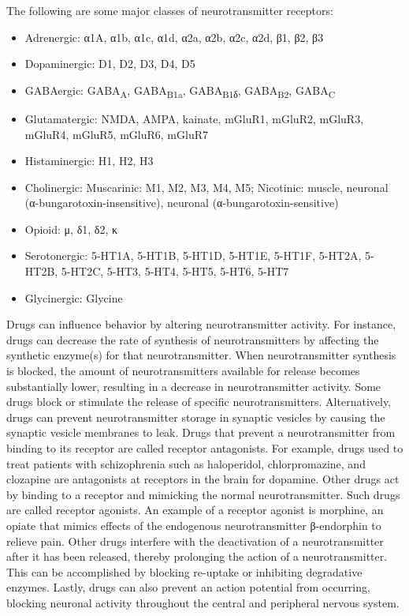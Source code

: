 The following are some major classes of neurotransmitter receptors:

\begin{itemize}
\tightlist
\item
  Adrenergic: α1A, α1b, α1c, α1d, α2a, α2b, α2c, α2d, β1, β2, β3
\item
  Dopaminergic: D1, D2, D3, D4, D5
\item
  GABAergic: GABA\textsubscript{A}, GABA\textsubscript{B1a}, GABA\textsubscript{B1δ}, GABA\textsubscript{B2}, GABA\textsubscript{C}
\item
  Glutamatergic: NMDA, AMPA, kainate, mGluR1, mGluR2, mGluR3, mGluR4, mGluR5, mGluR6, mGluR7
\item
  Histaminergic: H1, H2, H3
\item
  Cholinergic: Muscarinic: M1, M2, M3, M4, M5; Nicotinic: muscle, neuronal (α-bungarotoxin-insensitive), neuronal (α-bungarotoxin-sensitive)
\item
  Opioid: μ, δ1, δ2, κ
\item
  Serotonergic: 5-HT1A, 5-HT1B, 5-HT1D, 5-HT1E, 5-HT1F, 5-HT2A, 5-HT2B, 5-HT2C, 5-HT3, 5-HT4, 5-HT5, 5-HT6, 5-HT7
\item
  Glycinergic: Glycine
\end{itemize}

Drugs can influence behavior by altering neurotransmitter activity. For instance, drugs can decrease the rate of synthesis of neurotransmitters by affecting the synthetic enzyme(s) for that neurotransmitter. When neurotransmitter synthesis is blocked, the amount of neurotransmitters available for release becomes substantially lower, resulting in a decrease in neurotransmitter activity. Some drugs block or stimulate the release of specific neurotransmitters. Alternatively, drugs can prevent neurotransmitter storage in synaptic vesicles by causing the synaptic vesicle membranes to leak. Drugs that prevent a neurotransmitter from binding to its receptor are called receptor antagonists. For example, drugs used to treat patients with schizophrenia such as haloperidol, chlorpromazine, and clozapine are antagonists at receptors in the brain for dopamine. Other drugs act by binding to a receptor and mimicking the normal neurotransmitter. Such drugs are called receptor agonists. An example of a receptor agonist is morphine, an opiate that mimics effects of the endogenous neurotransmitter β-endorphin to relieve pain. Other drugs interfere with the deactivation of a neurotransmitter after it has been released, thereby prolonging the action of a neurotransmitter. This can be accomplished by blocking re-uptake or inhibiting degradative enzymes. Lastly, drugs can also prevent an action potential from occurring, blocking neuronal activity throughout the central and peripheral nervous system.

